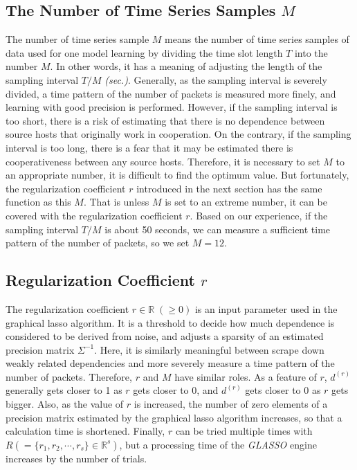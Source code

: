 \documentclass[conference]{IEEEtran}
\begin{document}
\subsection{The Number of Time Series Samples $M$}
The number of time series sample $M$ means the number of time series samples of data used for one model learning by dividing the time slot length $T$ into the number $M$.
In other words, it has a meaning of adjusting the length of the sampling interval $T/M$ {\it (sec.)}.
Generally, as the sampling interval is severely divided, a time pattern of the number of packets is measured more finely, and learning with good precision is performed.
However, if the sampling interval is too short, there is a risk of estimating that there is no dependence between source hosts that originally work in cooperation.
On the contrary, if the sampling interval is too long, there is a fear that it may be estimated there is cooperativeness between any source hosts.
Therefore, it is necessary to set $M$ to an appropriate number, it is difficult to find the optimum value.
But fortunately, the regularization coefficient $r$ introduced in the next section has the same function as this $M$.
That is unless $M$ is set to an extreme number, it can be covered with the regularization coefficient $r$.
Based on our experience, if the sampling interval $T/M$ is about 50 seconds, we can measure a sufficient time pattern of the number of packets, so we set $M=12$.





\subsection{Regularization Coefficient $r$}
The regularization coefficient $r\in\mathbb{R}\;(\geq 0)$ is an input parameter used in the graphical lasso algorithm.
It is a threshold to decide how much dependence is considered to be derived from noise, and adjusts a sparsity of an estimated precision matrix $\Sigma^{-1}$.
Here, it is similarly meaningful between scrape down weakly related dependencies and more severely measure a time pattern of the number of packets.
Therefore, $r$ and $M$ have similar roles.
As a feature of $r$, $d^{(r)}$ generally gets closer to 1 as $r$ gets closer to 0, and $d^{(r)}$ gets closer to 0 as $r$ gets bigger.
Also, as the value of $r$ is increased, the number of zero elements of a precision matrix estimated by the graphical lasso algorithm increases, so that a calculation time is shortened.
Finally, $r$ can be tried multiple times with $R ( = \{r_1, r_2, \cdots, r_s\}\in\mathbb{R}^s)$, but a processing time of the {\it GLASSO} engine increases by the number of trials.
\end{document}
